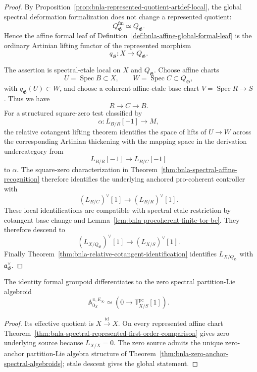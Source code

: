 \begin{proof}
By Proposition~\ref{prop:bnla-represented-quotient-artdef-local}, the global
spectral deformation formalization does not change a represented quotient:
\[
    Q^{\mathrm{fm}}_{\mathfrak G}
    \simeq
    Q_{\mathfrak G}.
\]
Hence the affine formal leaf of
Definition~\ref{def:bnla-affine-global-formal-leaf} is the ordinary Artinian
lifting functor of the represented morphism
\[
    q_{\mathfrak G}:X\longrightarrow Q_{\mathfrak G}.
\]

The assertion is spectral-etale local on $X$ and $Q_{\mathfrak G}$.  Choose
affine charts
\[
    U=\operatorname{Spec}B\subset X,
    \qquad
    W=\operatorname{Spec}C\subset Q_{\mathfrak G},
\]
with $q_{\mathfrak G}(U)\subset W$, and choose a coherent affine-etale base
chart $V=\operatorname{Spec}R\to S$.  Thus we have
\[
    R\longrightarrow C\longrightarrow B.
\]
For a structured square-zero test classified by
\[
    \alpha:L_{B/R}[-1]\longrightarrow M,
\]
the relative cotangent lifting theorem identifies the space of lifts of
$U\to W$ across the corresponding Artinian thickening with the mapping space
in the derivation undercategory from
\[
    L_{B/R}[-1]\longrightarrow L_{B/C}[-1]
\]
to $\alpha$.  The square-zero characterization in
Theorem~\ref{thm:bnla-spectral-affine-recognition} therefore identifies the
underlying anchored pro-coherent controller with
\[
\boxed{
    (L_{B/C})^\vee[1]
    \longrightarrow
    (L_{B/R})^\vee[1].}
\]
These local identifications are compatible with spectral etale restriction by
cotangent base change and
Lemma~\ref{lem:bnla-procoherent-finite-tor-bc}.  They therefore descend to
\[
    (L_{X/Q_{\mathfrak G}})^\vee[1]
    \longrightarrow
    (L_{X/S})^\vee[1].
\]
Finally
Theorem~\ref{thm:bnla-relative-cotangent-identification} identifies
$L_{X/Q_{\mathfrak G}}$ with
$\mathfrak a^\vee_{\mathfrak G}$.
\end{proof}

\begin{corollary}
\label{cor:bnla-identity-spectral-algebroid}
The identity formal groupoid differentiates to the zero spectral
partition-Lie algebroid
\[
\boxed{
    \mathbb A^{\pi,E_\infty}_{0_X}
    \simeq
    \left(
        0\longrightarrow\mathbb T^{\mathrm{pc}}_{X/S}[1]
    \right).}
\]
\end{corollary}

\begin{proof}
Its effective quotient is $X\xrightarrow{\operatorname{id}}X$.  On every
represented affine chart Theorem~\ref{thm:bnla-spectral-represented-first-order-comparison}
gives zero underlying source because $L_{X/X}=0$.  The zero source admits the
unique zero-anchor partition-Lie algebra structure of
Theorem~\ref{thm:bnla-zero-anchor-spectral-algebroids}; etale descent gives the
global statement.
\end{proof}

